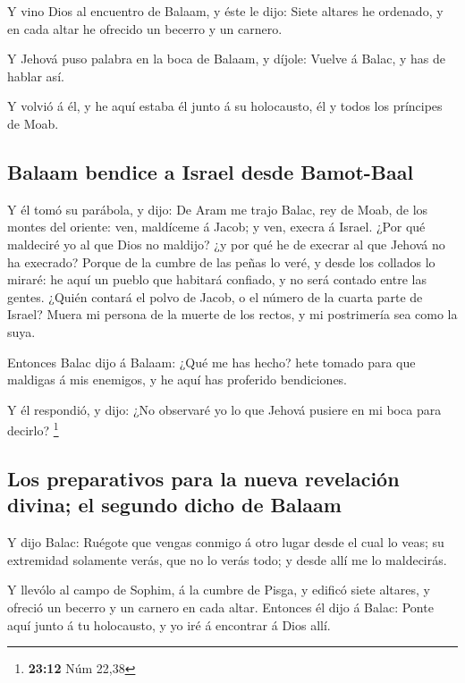  Y vino Dios al encuentro de Balaam, y éste le dijo: Siete
altares he ordenado, y en cada altar he ofrecido un becerro y un
carnero.

 Y Jehová puso palabra en la boca de Balaam, y díjole:
Vuelve á Balac, y has de hablar así.

 Y volvió á él, y he aquí estaba él junto á su holocausto,
él y todos los príncipes de Moab.

\hypertarget{balaam-bendice-a-israel-desde-bamot-baal}{%
\subsection{Balaam bendice a Israel desde
Bamot-Baal}\label{balaam-bendice-a-israel-desde-bamot-baal}}

 Y él tomó su parábola, y dijo: De Aram me trajo Balac,
rey de Moab, de los montes del oriente: ven, maldíceme á Jacob; y ven,
execra á Israel.  ¿Por qué maldeciré yo al que Dios no
maldijo? ¿y por qué he de execrar al que Jehová no ha execrado?
 Porque de la cumbre de las peñas lo veré, y desde los
collados lo miraré: he aquí un pueblo que habitará confiado, y no será
contado entre las gentes.  ¿Quién contará el polvo de
Jacob, o el número de la cuarta parte de Israel? Muera mi persona de la
muerte de los rectos, y mi postrimería sea como la suya.

 Entonces Balac dijo á Balaam: ¿Qué me has hecho? hete
tomado para que maldigas á mis enemigos, y he aquí has proferido
bendiciones.

 Y él respondió, y dijo: ¿No observaré yo lo que Jehová
pusiere en mi boca para decirlo? \footnote{\textbf{23:12} Núm 22,38}

\hypertarget{los-preparativos-para-la-nueva-revelaciuxf3n-divina-el-segundo-dicho-de-balaam}{%
\subsection{Los preparativos para la nueva revelación divina; el segundo
dicho de
Balaam}\label{los-preparativos-para-la-nueva-revelaciuxf3n-divina-el-segundo-dicho-de-balaam}}

 Y dijo Balac: Ruégote que vengas conmigo á otro lugar
desde el cual lo veas; su extremidad solamente verás, que no lo verás
todo; y desde allí me lo maldecirás.

 Y llevólo al campo de Sophim, á la cumbre de Pisga, y
edificó siete altares, y ofreció un becerro y un carnero en cada altar.
 Entonces él dijo á Balac: Ponte aquí junto á tu
holocausto, y yo iré á encontrar á Dios allí.

